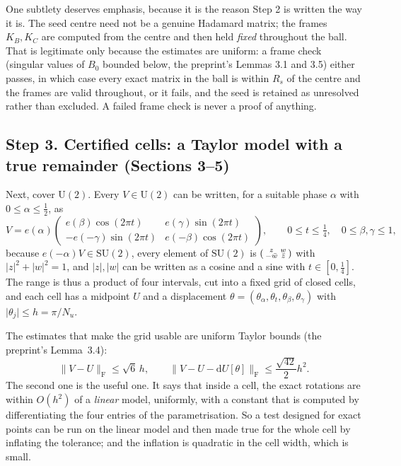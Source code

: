 \documentclass[11pt]{article}
\theoremstyle{definition}
\theoremstyle{plain}
\theoremstyle{definition}
\newcommand{\U}{\mathrm{U}}
\newcommand{\SU}{\mathrm{SU}}
\newcommand{\abs}[1]{\lvert #1\rvert}
\newcommand{\norm}[1]{\lVert #1\rVert}
\newcommand{\Frob}{\mathrm{F}}
\newcommand{\dd}{\mathrm{d}}
\begin{document}
One subtlety deserves emphasis, because it is the reason Step 2 is written the way it is. The seed
centre need not be a genuine Hadamard matrix; the frames $K_B,K_C$ are computed from the centre and
then held \emph{fixed} throughout the ball. That is legitimate only because the estimates are uniform:
a frame check (singular values of $B_0$ bounded below, the preprint's Lemmas 3.1 and 3.5) either passes, in which
case every exact matrix in the ball is within $R_s$ of the centre and the frames are valid
throughout, or it fails, and the seed is retained as unresolved rather than excluded. A failed frame
check is never a proof of anything.

\subsection*{Step 3. Certified cells: a Taylor model with a true remainder (Sections 3--5)}

Next, cover $\U(2)$. Every $V\in\U(2)$ can be written, for a suitable phase $\alpha$ with
$0\le\alpha\le\tfrac12$, as
\[
V=e(\alpha)\begin{pmatrix} e(\beta)\cos(2\pi t) & e(\gamma)\sin(2\pi t)\\
-e(-\gamma)\sin(2\pi t) & e(-\beta)\cos(2\pi t)\end{pmatrix},
\qquad 0\le t\le\tfrac14,\quad 0\le\beta,\gamma\le1,
\]
because $e(-\alpha)V\in\SU(2)$, every element of $\SU(2)$ is $\begin{psmallmatrix}z&w\\-\bar w&\bar z\end{psmallmatrix}$
with $\abs z^2+\abs w^2=1$, and $\abs z,\abs w$ can be written as a cosine and a sine with
$t\in[0,\tfrac14]$. The range is thus a product of four intervals, cut into a fixed grid of closed
cells, and each cell has a midpoint $U$ and a displacement
$\theta=(\theta_\alpha,\theta_t,\theta_\beta,\theta_\gamma)$ with $\abs{\theta_j}\le h=\pi/N_u$.

The estimates that make the grid usable are uniform Taylor bounds (the preprint's Lemma~3.4):
\begin{equation}\label{eq:taylor}
\norm{V-U}_{\Frob}\le\sqrt6\,h,\qquad
\norm{V-U-\dd U[\theta]}_{\Frob}\le\frac{\sqrt{42}}{2}h^2 .
\end{equation}
The second one is the useful one. It says that inside a cell, the exact rotations are within
$O(h^2)$ of a \emph{linear} model, uniformly, with a constant that is computed by differentiating the
four entries of the parametrisation. So a test designed for exact points can be run on the linear
model and then made true for the whole cell by inflating the tolerance; and the inflation is
quadratic in the cell width, which is small.
\end{document}
